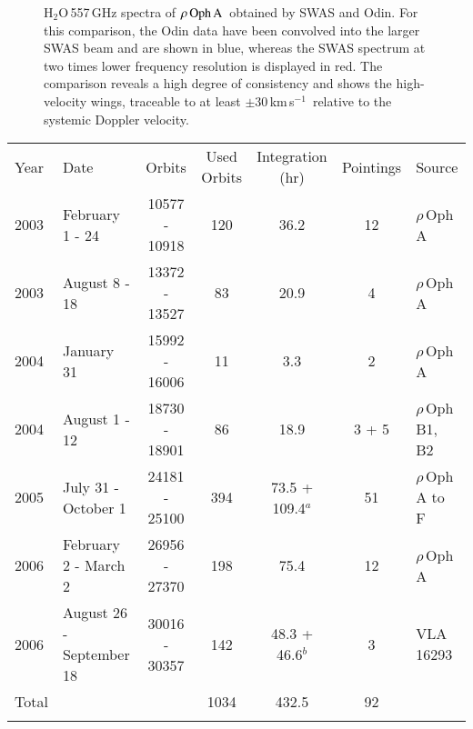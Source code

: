 \documentclass{aa}
\newcommand{\kms}{km\,s$^{-1}$}       %
\newcommand{\water}{H$_{2}$O}
\newcommand{\roa}{$\rho \, {\rm Oph \, A}$}
\begin{document}
\begin{figure}
  \caption{\water\,557\,GHz spectra of \roa\ obtained by SWAS and Odin. For this comparison, the Odin data have been convolved into the larger SWAS beam and are shown in blue, whereas the SWAS spectrum at two times lower frequency resolution is displayed in red. The comparison reveals a high degree of consistency and shows the high-velocity wings, traceable to at least $\pm 30$\,\kms\ relative to the systemic Doppler velocity.
        }
  \label{odin_swas}
\end{figure}

\begin{table*}[ht]
  \caption[]{Journal of Odin \water\,557\,GHz observations}
  \label{obsrounds}
  \centering          
  \begin{tabular}{l l c c c c l}     %
  \hline\hline        
       \noalign{\smallskip}
       Year  &  Date                                         & Orbits           & Used Orbits     &        Integration (hr) &  Pointings          & Source \\
       \noalign{\smallskip}
       \hline
       \noalign{\smallskip}
       2003  &  February 1 - 24                       & 10577 - 10918  &         120     &         36.2          &          12           & $\rho$\,Oph A\\
       2003  &  August 8 - 18                 & 13372 - 13527  &\phantom{1}83&         20.9            &\phantom{1}4           & $\rho$\,Oph A\\
       2004  &  January 31                             & 15992 - 16006  &\phantom{1}11&\phantom{1}3.3         &\phantom{1}2           & $\rho$\,Oph A\\
       2004  &  August 1 - 12                 & 18730 - 18901   &\phantom{1}86&         18.9            &        3 + 5          & $\rho$\,Oph B1, B2 \\
       2005  &  July 31 - October 1           & 24181 - 25100   &          394   & 73.5 + 109.4$^a$      &          51           & $\rho$\,Oph A to F \\
       2006  &  February 2 -  March 2         & 26956 - 27370   &       198     &         75.4            &          12           & $\rho$\,Oph A\\
       2006  & August 26 - September 18  & 30016 - 30357   &               142   &  48.3 + 46.6$^b$      &\phantom{1}3           & VLA 16293  \\
       \hline
       \hline
        \noalign{\smallskip}
       Total &                                               &                               &    1034   &        432.5          &        92                     &                          \\
       \noalign{\smallskip}
       \hline
\end{tabular}
\end{table*}
\end{document}
